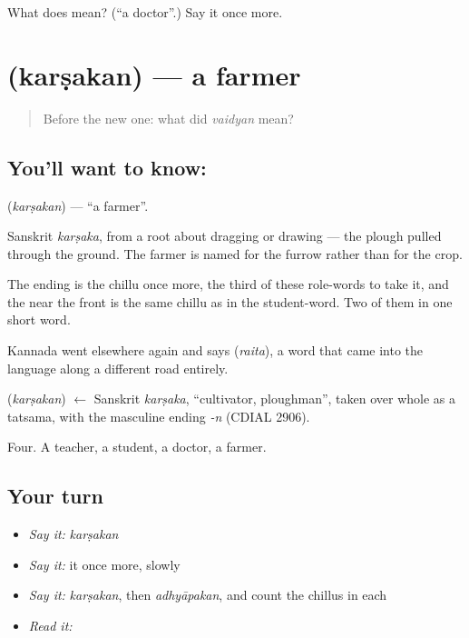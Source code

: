 \begin{tcolorbox}[breakable,colback=teal!4,colframe=teal!35!black,title={Before you move on}]
What does  mean? (\textquotedblleft{}a doctor\textquotedblright{}.) Say it once more.
\end{tcolorbox}
\section[\texorpdfstring{\ml{കർഷകൻ} (karṣakan)}{കർഷകൻ (karṣakan)}]{ (karṣakan) — a farmer}

\label{lesson:ML-C48-farmer}



\begin{quote}
Before the new one: what did \emph{vaidyan} mean?
\end{quote}

\subsection*{You'll want to know: }
\textbf{} (\emph{karṣakan}) — \textquotedblleft{}a farmer\textquotedblright{}.

Sanskrit \emph{karṣaka}, from a root about dragging or drawing — the plough pulled through the ground. The farmer is named for the furrow rather than for the crop.

The ending is the chillu  once more, the third of these role-words to take it, and the  near the front is the same chillu as in the student-word. Two of them in one short word.

Kannada went elsewhere again and says  (\emph{raita}), a word that came into the language along a different road entirely.

\begin{cousinweb}
\textbf{} (\emph{karṣakan}) $\leftarrow$ Sanskrit \emph{karṣaka}, \textquotedblleft{}cultivator, ploughman\textquotedblright{}, taken over whole as a tatsama, with the masculine ending \emph{-n} (CDIAL 2906).
\end{cousinweb}

\begin{grammarlens}[title={What you've built}]
Four. A teacher, a student, a doctor, a farmer.
\end{grammarlens}

\subsection*{Your turn}
\begin{itemize}
\raggedright
  \item \emph{Say it:} \emph{karṣakan}
  \item \emph{Say it:} it once more, slowly
  \item \emph{Say it:} \emph{karṣakan}, then \emph{adhyāpakan}, and count the chillus in each
  \item \emph{Read it:} \textbf{}
\end{itemize}


